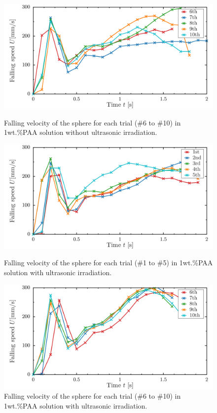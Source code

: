 \begin{figure}[ht]
    \centering
    \includegraphics[width=12cm,clip]{4-Results/s1-6-10.png}
    \caption{Falling velocity of the sphere for each trial (\#6 to \#10) in 1wt.\%PAA solution without ultrasonic irradiation.}
    \label{fig:1PAA-falling6-10}
    \centering
    \includegraphics[width=12cm,clip]{4-Results/s1-39-1-5.png}
    \caption{Falling velocity of the sphere for each trial (\#1 to \#5) in 1wt.\%PAA solution with ultrasonic irradiation.}
    \label{fig:1onPAA-falling1-5}
    \centering
    \includegraphics[width=12cm,clip]{4-Results/s1-39-6-10.png}
    \caption{Falling velocity of the sphere for each trial (\#6 to \#10) in 1wt.\%PAA solution with ultrasonic irradiation.}
    \label{fig:1onPAA-falling6-10}
\end{figure}
